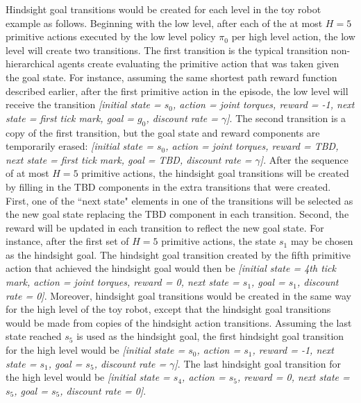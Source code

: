 \documentclass{article} %
\begin{document}
Hindsight goal transitions would be created for each level in the toy robot example as follows.  Beginning with the low level, after each of the at most $H=5$ primitive actions executed by the low level policy $\pi_0$ per high level action, the low level will create two transitions.  The first transition is the typical transition non-hierarchical agents create evaluating the primitive action that was taken given the goal state.  For instance, assuming the same shortest path reward function described earlier, after the first primitive action in the episode, the low level will receive the transition \textit{[initial state = $s_0$, action = joint torques, reward = -1, next state = first tick mark, goal = $g_0$, discount rate = $\gamma$]}.  The second transition is a copy of the first transition, but the goal state and reward components are temporarily erased: \textit{[initial state = $s_0$, action = joint torques, reward = TBD, next state = first tick mark, goal = TBD, discount rate = $\gamma$]}.  After the sequence of at most $H=5$ primitive actions, the hindsight goal transitions will be created by filling in the TBD components in the extra transitions that were created.  First, one of the ``next state" elements in one of the transitions will be selected as the new goal state replacing the TBD component in each transition.  Second, the reward will be updated in each transition to reflect the new goal state.  For instance, after the first set of $H=5$ primitive actions, the state $s_1$ may be chosen as the hindsight goal.  The hindsight goal transition created by the fifth primitive action that achieved the hindsight goal would then be \textit{[initial state = 4th tick mark, action = joint torques, reward = 0, next state = $s_1$, goal = $s_1$, discount rate = 0]}.  Moreover, hindsight goal transitions would be created in the same way for the high level of the toy robot, except that the hindsight goal transitions would be made from copies of the hindsight action transitions.  Assuming the last state reached $s_5$ is used as the hindsight goal, the first hindsight goal transition for the high level would be \textit{[initial state = $s_0$, action = $s_1$, reward = -1, next state = $s_1$, goal = $s_5$, discount rate = $\gamma$]}.  The last hindsight goal transition for the high level would be \textit{[initial state = $s_4$, action = $s_5$, reward = 0, next state = $s_5$, goal = $s_5$, discount rate = 0]}.    
\end{document}
